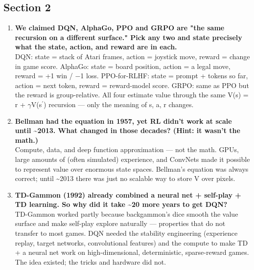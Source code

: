 \documentclass[11pt]{article}
\begin{document}
\subsection*{Section 2}
\begin{enumerate}[leftmargin=1.5em,itemsep=5pt]
\item \textbf{We claimed DQN, AlphaGo, PPO and GRPO are "the same recursion on a different surface." Pick any two and state precisely what the state, action, and reward are in each.}\\[2pt]
\textcolor{ink2}{DQN: state = stack of Atari frames, action = joystick move, reward = change in game score. AlphaGo: state = board position, action = a legal move, reward = +1 win / \ensuremath{-}1 loss. PPO-for-RLHF: state = prompt + tokens so far, action = next token, reward = reward-model score. GRPO: same as PPO but the reward is group-relative. All four estimate value through the same V(s) = r + \ensuremath{\gamma}V(s\ensuremath{{}^{\prime}}) recursion --- only the meaning of s, a, r changes.}
\item \textbf{Bellman had the equation in 1957, yet RL didn't work at scale until \textasciitilde{}2013. What changed in those decades? (Hint: it wasn't the math.)}\\[2pt]
\textcolor{ink2}{Compute, data, and deep function approximation --- not the math. GPUs, large amounts of (often simulated) experience, and ConvNets made it possible to represent value over enormous state spaces. Bellman's equation was always correct; until \textasciitilde{}2013 there was just no scalable way to store V over pixels.}
\item \textbf{TD-Gammon (1992) already combined a neural net + self-play + TD learning. So why did it take \textasciitilde{}20 more years to get DQN?}\\[2pt]
\textcolor{ink2}{TD-Gammon worked partly because backgammon's dice smooth the value surface and make self-play explore naturally --- properties that do not transfer to most games. DQN needed the stability engineering (experience replay, target networks, convolutional features) and the compute to make TD + a neural net work on high-dimensional, deterministic, sparse-reward games. The idea existed; the tricks and hardware did not.}
\end{enumerate}
\end{document}
